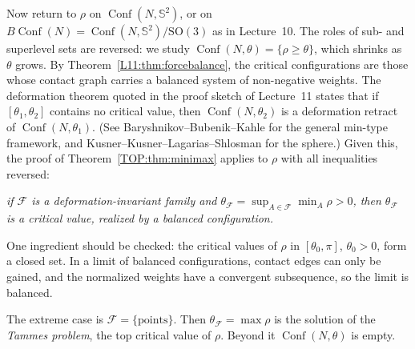 \documentclass[11pt,openany]{book}
\theoremstyle{plain}
\theoremstyle{definition}
\theoremstyle{remark}
\newcommand{\Sph}{\mathbb{S}}          %
\newcommand{\SO}{\mathrm{SO}}
\newcommand{\Conf}{\operatorname{Conf}}
\begin{document}
Now return to $\rho$ on $\Conf(N,\Sph^2)$, or on $B\Conf(N)=\Conf(N,\Sph^2)/\SO(3)$ as in Lecture~10. The
roles of sub- and superlevel sets are reversed: we study $\Conf(N,\theta)=\{\rho\ge\theta\}$, which shrinks
as $\theta$ grows. By Theorem~\ref{L11:thm:forcebalance}, the critical configurations are those whose
contact graph carries a balanced system of non-negative weights. The deformation theorem quoted in the
proof sketch of Lecture~11 states that if $[\theta_1,\theta_2]$ contains no critical value, then
$\Conf(N,\theta_2)$ is a deformation retract of $\Conf(N,\theta_1)$. (See Baryshnikov--Bubenik--Kahle for
the general min-type framework, and Kusner--Kusner--Lagarias--Shlosman for the sphere.) Given this, the proof
of Theorem~\ref{TOP:thm:minimax} applies to $\rho$ with all inequalities reversed:
\begin{center}
\emph{if $\mathcal F$ is a deformation-invariant family and
$\theta_{\mathcal F}=\sup_{A\in\mathcal F}\min_A\rho>0$, then $\theta_{\mathcal F}$ is a critical value,
realized by a balanced configuration.}
\end{center}
One ingredient should be checked: the critical values of $\rho$ in $[\theta_0,\pi]$, $\theta_0>0$, form a
closed set. In a limit of balanced configurations, contact edges can only be gained, and the normalized
weights have a convergent subsequence, so the limit is balanced.

The extreme case is $\mathcal F=\{\text{points}\}$. Then $\theta_{\mathcal F}=\max\rho$ is the solution of
the \emph{Tammes problem}, the top critical value of $\rho$. Beyond it $\Conf(N,\theta)$ is empty.
\end{document}

